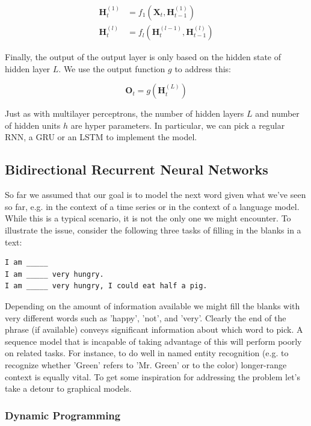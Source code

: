 $$\begin{aligned}
\mathbf{H}_t^{(1)} & = f_1\left(\mathbf{X}_t, \mathbf{H}_{t-1}^{(1)}\right) \\
\mathbf{H}_t^{(l)} & = f_l\left(\mathbf{H}_t^{(l-1)}, \mathbf{H}_{t-1}^{(l)}\right)
\end{aligned}$$

Finally, the output of the output layer is only based on the hidden state of hidden layer $L$. We use the output function $g$ to address this:

$$\mathbf{O}_t = g \left(\mathbf{H}_t^{(L)}\right)$$

Just as with multilayer perceptrons, the number of hidden layers $L$ and number of hidden units $h$ are hyper parameters. In particular, we can pick a regular RNN, a GRU or an LSTM to implement the model.

\subsection{Bidirectional Recurrent Neural Networks}

So far we assumed that our goal is to model the next word given what we've seen so far, e.g. in the context of a time series or in the context of a language model. While this is a typical scenario, it is not the only one we might encounter. To illustrate the issue, consider the following three tasks of filling in the blanks in a text:

\begin{verbatim}
I am _____
I am _____ very hungry.
I am _____ very hungry, I could eat half a pig.    
\end{verbatim}

Depending on the amount of information available we might fill the blanks with very different words such as 'happy', 'not', and 'very'. Clearly the end of the phrase (if available) conveys significant information about which word to pick. A sequence model that is incapable of taking advantage of this will perform poorly on related tasks. For instance, to do well in named entity recognition (e.g. to recognize whether 'Green' refers to 'Mr. Green' or to the color) longer-range context is equally vital. To get some inspiration for addressing the problem let's take a detour to graphical models.

\subsubsection{Dynamic Programming}

